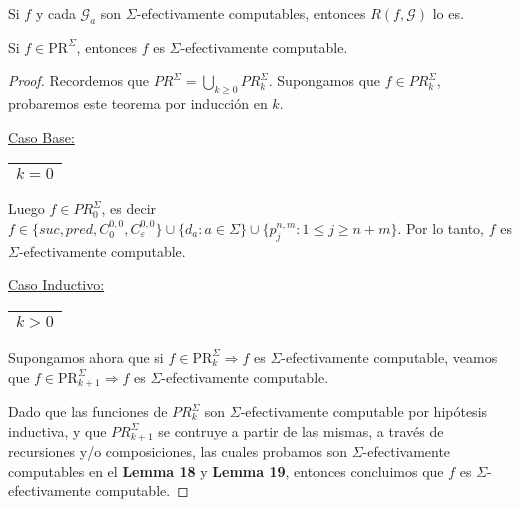   \begin{lemma}
    \par Si $f$ y cada $\mathcal{G}_{a}$ son $\Sigma$-efectivamente computables, entonces $R(f, \mathcal{G})$ lo es.
  \end{lemma}

  \begin{theorem}
    \par Si $f \in \mathrm{PR}^{\Sigma}$, entonces $f$ es $\Sigma$-efectivamente computable.
  \end{theorem}
  \begin{proof}
    \par Recordemos que $PR^{\Sigma} = \bigcup\limits_{k \geq 0} PR_{k}^{\Sigma}$. Supongamos que $f \in
    PR_{k}^{\Sigma}$, probaremos este teorema por inducción en $k$.

    \vspace{3mm}
    \underline{Caso Base:} \begin{tabular}{|c|} \hline $k = 0$ \\\hline \end{tabular}

    \par Luego $f \in PR_{0}^{\Sigma}$, es decir $f \in \{suc, pred, C_{0}^{0,0}, C_{\varepsilon}^{0,0}\} \cup \{d_{a}:
    a \in \Sigma\} \cup \{p_{j}^{n,m} : 1 \leq j \geq n+m\}$. Por lo tanto, $f$ es $\Sigma$-efectivamente computable.

    \vspace{3mm}
		\underline{Caso Inductivo:} \begin{tabular}{|c|} \hline $k > 0$ \\\hline \end{tabular}

    \par Supongamos ahora que si $f \in \mathrm{PR}_{k}^{\Sigma} \Rightarrow f$ es
    $\Sigma$-efectivamente computable, veamos que $f \in \mathrm{PR}_{k+1}^{\Sigma} \Rightarrow f$ es
    $\Sigma$-efectivamente computable.

    \par Dado que las funciones de $PR_{k}^{\Sigma}$ son $\Sigma$-efectivamente computable por hipótesis inductiva, y
    que $PR_{k+1}^{\Sigma}$ se contruye a partir de las mismas, a través de recursiones y/o composiciones, las cuales
    probamos son $\Sigma$-efectivamente computables en el \textbf{Lemma 18} y \textbf{Lemma 19}, entonces concluimos que
    $f$ es $\Sigma$-efectivamente computable.
  \end{proof}

